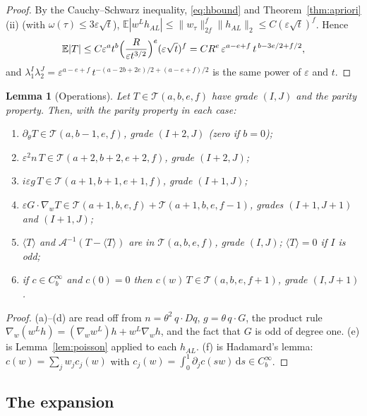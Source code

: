 \documentclass[11pt]{article}
\newcommand{\dd}{\mathrm{d}}
\newcommand{\E}{\mathbb{E}}
\newcommand{\eps}{\varepsilon}
\newcommand{\cA}{\mathcal{A}}
\newcommand{\cT}{\mathcal{T}}
\newcommand{\nrm}[2]{\|#1\|_{#2}}
\newcommand{\avg}[1]{\langle #1\rangle}
\newtheorem{lemma}[theorem]{Lemma}
\theoremstyle{remark}
\begin{document}
\begin{proof}
By the Cauchy--Schwarz inequality, \eqref{eq:hbound} and
Theorem~\ref{thm:apriori}(ii) (with $\omega(\tau)\le3\eps\sqrt t$),
$\E|w^Lh_{AL}|\le\nrm{w_\tau}{2f}^f\nrm{h_{AL}}{2}\le C(\eps\sqrt t)^f$.
Hence
\[
  \E|T|\le C\eps^at^b\Bigl(\frac{R}{\eps t^{3/2}}\Bigr)^e(\eps\sqrt t)^f
  = CR^e\,\eps^{a-e+f}\,t^{\,b-3e/2+f/2},
\]
and $\lambda_1^I\lambda_2^J = \eps^{a-e+f}\,t^{-(a-2b+2e)/2+(a-e+f)/2}$ is the
same power of $\eps$ and $t$.
\end{proof}

\begin{lemma}[Operations]\label{lem:ops}
Let $T\in\cT(a,b,e,f)$ have grade $(I,J)$ and the parity property. Then, with
the parity property in each case:
\begin{enumerate}
\item[(a)] $\partial_\theta T\in\cT(a,b-1,e,f)$, grade $(I+2,J)$ (zero if $b=0$);
\item[(b)] $\eps^2n\,T\in\cT(a+2,b+2,e+2,f)$, grade $(I+2,J)$;
\item[(c)] $i\eps g\,T\in\cT(a+1,b+1,e+1,f)$, grade $(I+1,J)$;
\item[(d)] $\eps G\cdot\nabla_wT\in\cT(a+1,b,e,f) + \cT(a+1,b,e,f-1)$,
  grades $(I+1,J+1)$ and $(I+1,J)$;
\item[(e)] $\avg T$ and $\cA^{-1}(T-\avg T)$ are in $\cT(a,b,e,f)$, grade
  $(I,J)$; $\avg T=0$ if $I$ is odd;
\item[(f)] if $c\in C_b^\infty$ and $c(0)=0$ then
  $c(w)\,T\in\cT(a,b,e,f+1)$, grade $(I,J+1)$.
\end{enumerate}
\end{lemma}

\begin{proof}
(a)--(d) are read off from $n = \theta^2\,q\cdot Dq$,
$g = \theta\,q\cdot G$, the product rule
$\nabla_w(w^Lh) = (\nabla_ww^L)h + w^L\nabla_wh$, and the fact that $G$ is
odd of degree one. (e) is Lemma~\ref{lem:poisson} applied to each $h_{AL}$.
(f) is Hadamard's lemma: $c(w) = \sum_jw_jc_j(w)$ with
$c_j(w) = \int_0^1\partial_jc(sw)\,\dd s\in C_b^\infty$.
\end{proof}

\subsection{The expansion}
\end{document}
